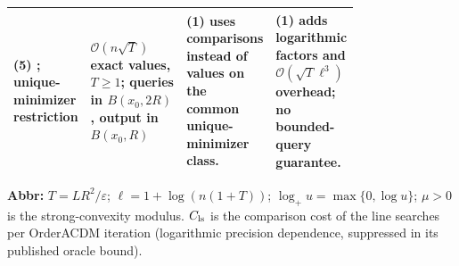 \begin{table}[tp]
\begin{threeparttable}
\begin{tabularx}{\linewidth}{@{}>{\raggedright\arraybackslash}p{0.20\linewidth}>{\raggedright\arraybackslash}p{0.32\linewidth}>{\raggedright\arraybackslash}p{0.25\linewidth}>{\raggedright\arraybackslash}X@{}}
\midrule
\textbf{(5)} \citep[Thm.~3.3]{csWu2026v2}; unique-minimizer restriction & $\mathcal{O}(n\sqrt T)$ exact values, $T\ge1$; queries in $B(x_0,2R)$, output in $B(x_0,R)$ & \textbf{(1)} uses comparisons instead of values on the common unique-minimizer class. & \textbf{(1)} adds logarithmic factors and $\mathcal{O}(\sqrt T\ell^3)$ overhead; no bounded-query guarantee. \\
\bottomrule
\end{tabularx}
\begin{tablenotes}[flushleft]\footnotesize
\item[] \textbf{Abbr:} $T=LR^2/\varepsilon$; $\ell=1+\log(n(1+T))$; $\log_+u=\max\{0,\log u\}$; $\mu>0$ is the strong-convexity modulus. $C_{\rm ls}$ is the comparison cost of the line searches per OrderACDM iteration (logarithmic precision dependence, suppressed in its published oracle bound).
\end{tablenotes}
\end{threeparttable}
\end{table}
\clearpage
